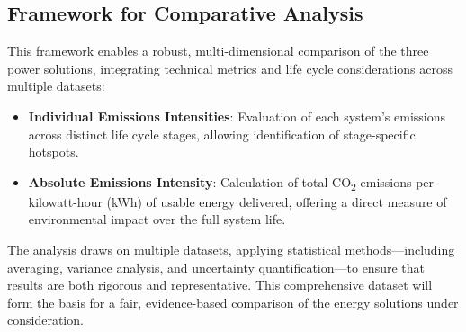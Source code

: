 \documentclass{article}
\begin{document}
\subsection{Framework for Comparative Analysis}
This framework enables a robust, multi-dimensional comparison of the three power solutions, integrating technical metrics and life cycle considerations across multiple datasets:
\begin{itemize}[itemsep=-1mm]
	\item \textbf{Individual Emissions Intensities}: Evaluation of each system's emissions across distinct life cycle stages, allowing identification of stage-specific hotspots.
	\item \textbf{Absolute Emissions Intensity}: Calculation of total CO\textsubscript{2} emissions per kilowatt-hour (kWh) of usable energy delivered, offering a direct measure of environmental impact over the full system life.
\end{itemize}
The analysis draws on multiple datasets, applying statistical methods—including averaging, variance analysis, and uncertainty quantification—to ensure that results are both rigorous and representative. This comprehensive dataset will form the basis for a fair, evidence-based comparison of the energy solutions under consideration.
\end{document}
